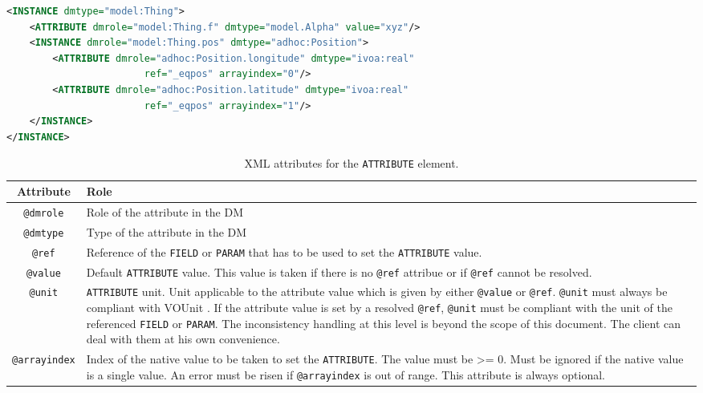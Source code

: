     
\begin{lstlisting}[caption={ATTRIBUTE examples},language=XML]
<INSTANCE dmtype="model:Thing">
    <ATTRIBUTE dmrole="model:Thing.f" dmtype="model.Alpha" value="xyz"/>		
    <INSTANCE dmrole="model:Thing.pos" dmtype="adhoc:Position">
        <ATTRIBUTE dmrole="adhoc:Position.longitude" dmtype="ivoa:real" 
                        ref="_eqpos" arrayindex="0"/>
        <ATTRIBUTE dmrole="adhoc:Position.latitude" dmtype="ivoa:real" 
                        ref="_eqpos" arrayindex="1"/>
    </INSTANCE>
</INSTANCE>
\end{lstlisting}  


\begin{table}[!htbp]
\small
\centering
\begin{tabulary}{\linewidth}{|c|J|}       
       \hline 
            \textbf{Attribute} & 
            \textbf {Role}\\
       \hline         \hline  
            \texttt{@dmrole} & 
            Role of the attribute in the DM\\
        \hline 
            \texttt{@dmtype} & 
            Type of the attribute in the DM\\
        \hline 
            \texttt{@ref} & 
            Reference of the \texttt{FIELD} or \texttt{PARAM} that has to be used to set the 
            \texttt{ATTRIBUTE} value.\\
        \hline 
            \texttt{@value}  &
            Default \texttt{ATTRIBUTE} value. This value is taken if there is no 
            \texttt{@ref} attribue or if \texttt{@ref} cannot be resolved.\\
        \hline 
            \texttt{@unit} & 
            \texttt{ATTRIBUTE} unit. Unit applicable to the attribute value which is given 
            by either \texttt{@value} or \texttt{@ref}. \texttt{@unit} must always 
            be compliant with VOUnit \citep{2014ivoa.spec.0523D}. 
            If the attribute value is set by a resolved \texttt{@ref}, 
            \texttt{@unit} must be compliant with the unit of the referenced
            \texttt{FIELD} or \texttt{PARAM}. The inconsistency handling at 
            this level is beyond the scope of this document. The client can 
            deal with them at his own convenience.\\
        \hline 
            \texttt{@arrayindex} & 
            Index of the native value to be taken to set the \texttt{ATTRIBUTE}. 
            The value must be >= 0.
            Must be ignored if the native value is a single value. 
            An error must be risen if \texttt{@arrayindex} is out of range.
            This attribute is always optional.\\
        \hline 
     \end{tabulary}
     \caption{XML attributes for the \texttt{ATTRIBUTE} element.} 
     \label{tbl:attribute-att}
 \end{table}

